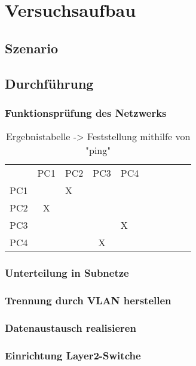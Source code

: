 \newpage
\section{Versuchsaufbau}

    \subsection{Szenario}

    \newpage
    \subsection{Durchführung}

        \subsubsection{Funktionsprüfung des Netzwerks}
        \begin{table}[H]
            \centering
            \begin{tabular}{l|c|l|c|l|c|l|c|l|c|}
            \multicolumn{1}{l}{} & \multicolumn{1}{l}{PC1} & \multicolumn{1}{l}{PC2} & \multicolumn{1}{l}{PC3} & \multicolumn{1}{l}{PC4}  \\ 
            \cline{2-5}
            PC1&&X&& \\ 
            \cline{2-5}
            PC2&X&&& \\
            \cline{2-5}
            PC3&&&&X \\
            \cline{2-5}
            PC4&&&X& \\
            \cline{2-5}
            \end{tabular}
            \caption{Ergebnistabelle -> Feststellung mithilfe von "ping"}
        \end{table}
        
        \subsubsection{Unterteilung in Subnetze}

        \newpage
        \subsubsection{Trennung durch VLAN herstellen}

        \newpage
        \subsubsection{Datenaustausch realisieren}

        \newpage
        \subsubsection{Einrichtung Layer2-Switche}